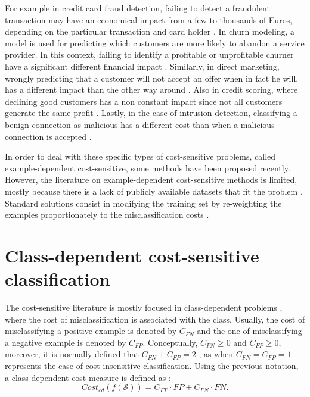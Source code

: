   For example in credit card fraud detection, failing to detect a fraudulent transaction may have 
  an economical impact from a few to thousands of Euros, depending on the particular transaction 
  and card holder \citep{Sahin2013}. In churn modeling, a model is used for predicting which
  customers are more likely to abandon a service provider. In this context, failing to identify a 
  profitable or unprofitable churner have a significant different financial impact 
  \citep{Glady2009}. Similarly, in direct marketing, wrongly predicting that a customer will not 
  accept an offer when in fact he will, has a different impact than the other way around 
  \citep{Zadrozny2003}. Also in credit scoring, where declining good customers has a non constant 
  impact since not all  customers generate the same profit \citep{Verbraken2014}. Lastly, in the 
  case of intrusion   detection, classifying a benign connection as malicious has a different cost 
  than when a   malicious connection is accepted \citep{Ma2011}.
  
  In order to deal with these specific types of cost-sensitive problems, called example-dependent
  cost-sensitive, some methods have been proposed recently. However, the literature on 
  example-dependent cost-sensitive methods is limited, mostly because there is a lack of publicly 
  available datasets that fit the problem \citep{MacAodha2013}. Standard solutions consist in 
  modifying the training set by re-weighting the examples proportionately to the misclassification 
  costs \citep{Elkan2001,Zadrozny2003}.

  
\section{Class-dependent cost-sensitive classification}
\label{sec:3:class-dependent}

The cost-sensitive literature is mostly focused in class-dependent problems \citep{Elkan2001}, where 
the cost of misclassification is associated with the class. Usually, the cost of misclassifying a 
positive example is denoted by $C_{FN}$ and the one of misclassifying a negative example is denoted 
by $C_{FP}$. Conceptually, $C_{FN}\ge0$ and $C_{FP}\ge0$, moreover, it is normally defined that 
$C_{FN}+C_{FP}=2$ \citep{Flach2011a}, as when $C_{FN}=C_{FP}=1$ represents the case of 
cost-insensitive classification. Using the previous notation, a class-dependent cost measure is 
defined as \citep{Wang2014}:
\begin{equation}
  Cost_{cd}(f(\mathcal{S})) = C_{FP} \cdot FP + C_{FN} \cdot FN.
\end{equation}

